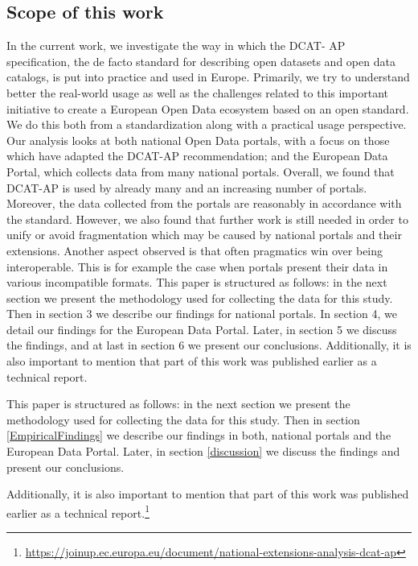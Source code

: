 \documentclass[<options>]{elsarticle}
\begin{document}
\subsection{Scope of this work}

In the current work, we investigate the way in which the DCAT- AP specification, the de facto standard for describing open datasets and open data catalogs, is put into practice and used in Europe. Primarily, we try to understand better the real-world usage as well as the challenges related to this important initiative to create a European Open Data ecosystem based on an open standard. We do this both from a standardization along with a practical usage perspective. Our analysis looks at both national Open Data portals, with a focus on those which have adapted the DCAT-AP recommendation; and the European Data Portal, which collects data from many national portals. Overall, we found that DCAT-AP is used by already many and an increasing number of portals. Moreover, the data collected from the portals are reasonably in accordance with the standard. However, we also found that further work is still needed in order to unify or avoid fragmentation which may be caused by national portals and their extensions. Another aspect observed is that often pragmatics win over being interoperable. This is for example the case when portals present their data in various incompatible formats.
This paper is structured as follows: in the next section we present the methodology used for collecting the data for this study. Then in section 3 we describe our findings for national portals. In section 4, we detail our findings for the European Data Portal. Later, in section 5 we discuss the findings, and at last in section 6 we present our conclusions. 
Additionally, it is also important to mention that part of this work was published earlier as a technical report.


This paper is structured as follows: in the next section we present the methodology used for collecting the data for this study. Then in section \ref{EmpiricalFindings} we describe our findings in both, national portals and the European Data Portal. Later, in section \ref{discussion} we discuss the findings and present our conclusions.

Additionally, it is also important to mention that part of this  work was published earlier as a technical report.\footnote{\href{https://joinup.ec.europa.eu/document/national-extensions-analysis-dcat-ap}{https://joinup.ec.europa.eu/document/national-extensions-analysis-dcat-ap}}
% 
\end{document}
